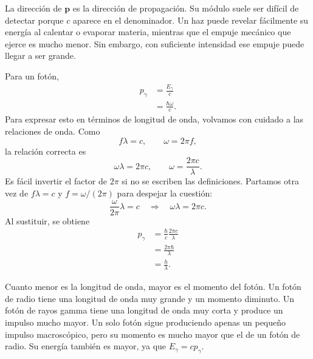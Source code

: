 La dirección de \(\mathbf p\) es la dirección de propagación. Su módulo suele ser difícil de detectar porque \(c\) aparece en el denominador. Un haz puede revelar fácilmente su energía al calentar o evaporar materia, mientras que el empuje mecánico que ejerce es mucho menor. Sin embargo, con suficiente intensidad ese empuje puede llegar a ser grande.

Para un fotón,
\begin{align}
p_\gamma
&=\frac{E_\gamma}{c}\\
&=\frac{\hbar\omega}{c}.
\end{align}
Para expresar esto en términos de longitud de onda, volvamos con cuidado a las relaciones de onda. Como
\begin{equation}
f\lambda=c,
\qquad
\omega=2\pi f,
\end{equation}
la relación correcta es
\begin{equation}
\omega\lambda=2\pi c,
\qquad
\omega=\frac{2\pi c}{\lambda}.
\end{equation}
Es fácil invertir el factor de \(2\pi\) si no se escriben las definiciones. Partamos otra vez de \(f\lambda=c\) y \(f=\omega/(2\pi)\) para despejar la cuestión:
\begin{equation}
\frac{\omega}{2\pi}\lambda=c
\quad\Longrightarrow\quad
\omega\lambda=2\pi c.
\end{equation}
Al sustituir, se obtiene
\begin{align}
p_\gamma
&=\frac{\hbar}{c}\frac{2\pi c}{\lambda}\\
&=\frac{2\pi\hbar}{\lambda}\\
&=\frac{h}{\lambda}.
\end{align}

\begin{classroomqa}
\end{classroomqa}

Cuanto menor es la longitud de onda, mayor es el momento del fotón. Un fotón de radio tiene una longitud de onda muy grande y un momento diminuto. Un fotón de rayos gamma tiene una longitud de onda muy corta y produce un impulso mucho mayor. Un solo fotón sigue produciendo apenas un pequeño impulso macroscópico, pero su momento es mucho mayor que el de un fotón de radio. Su energía también es mayor, ya que \(E_\gamma=cp_\gamma\).

